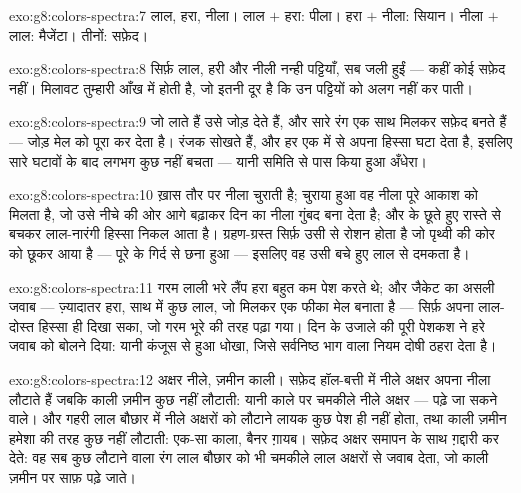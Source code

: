 \begin{solution}{exo:g8:colors-spectra:7}
लाल, हरा, नीला। लाल $+$ हरा: पीला। हरा $+$ नीला: सियान। नीला $+$
लाल: मैजेंटा। तीनों: सफ़ेद।
\end{solution}

\begin{solution}{exo:g8:colors-spectra:8}
सिर्फ़ लाल, हरी और नीली नन्ही पट्टियाँ, सब जली हुईं --- कहीं कोई
सफ़ेद नहीं। मिलावट तुम्हारी आँख में होती है, जो इतनी दूर है कि उन
पट्टियों को अलग नहीं कर पाती।
\end{solution}

\begin{solution}{exo:g8:colors-spectra:9}
 जो लाते हैं उसे जोड़ देते हैं, और सारे रंग एक साथ मिलकर सफ़ेद
बनते हैं --- जोड़ मेल को पूरा कर देता है। रंजक सोखते हैं, और हर एक
 में से अपना हिस्सा घटा देता है, इसलिए सारे घटावों के बाद लगभग
कुछ नहीं बचता --- यानी समिति से पास किया हुआ अँधेरा।
\end{solution}

\begin{solution}{exo:g8:colors-spectra:10}
 ख़ास तौर पर नीला चुराती है; चुराया हुआ वह नीला पूरे आकाश को मिलता
है, जो उसे नीचे की ओर आगे बढ़ाकर दिन का नीला गुंबद बना देता है; और
 के छूते हुए रास्ते से बचकर लाल-नारंगी हिस्सा निकल आता है।
ग्रहण-ग्रस्त  सिर्फ़ उसी  से रोशन होता है जो पृथ्वी की कोर
को छूकर आया है --- पूरे  के गिर्द  से छना हुआ ---
इसलिए वह उसी बचे हुए लाल से दमकता है।
\end{solution}

\begin{solution}{exo:g8:colors-spectra:11}
गरम लाली भरे लैंप हरा बहुत कम पेश करते थे; और जैकेट का असली जवाब ---
ज़्यादातर हरा, साथ में कुछ लाल, जो मिलकर एक फीका मेल बनाता है ---
सिर्फ़ अपना लाल-दोस्त हिस्सा ही दिखा सका, जो गरम भूरे की तरह पढ़ा गया।
दिन के उजाले की पूरी पेशकश ने हरे जवाब को बोलने दिया: यानी कंजूस
 से हुआ धोखा, जिसे सर्वनिष्ठ भाग वाला नियम दोषी ठहरा देता है।
\end{solution}

\begin{solution}{exo:g8:colors-spectra:12}
अक्षर नीले, ज़मीन काली। सफ़ेद हॉल-बत्ती में नीले अक्षर अपना नीला
लौटाते हैं जबकि काली ज़मीन कुछ नहीं लौटाती: यानी काले पर चमकीले नीले
अक्षर --- पढ़े जा सकने वाले। और गहरी लाल बौछार में नीले अक्षरों को
लौटाने लायक कुछ पेश ही नहीं होता, तथा काली ज़मीन हमेशा की तरह कुछ नहीं
लौटाती: एक-सा काला, बैनर ग़ायब। सफ़ेद अक्षर समापन के साथ ग़द्दारी कर
देते: वह सब कुछ लौटाने वाला रंग लाल बौछार को भी चमकीले लाल अक्षरों से
जवाब देता, जो काली ज़मीन पर साफ़ पढ़े जाते।
\end{solution}

